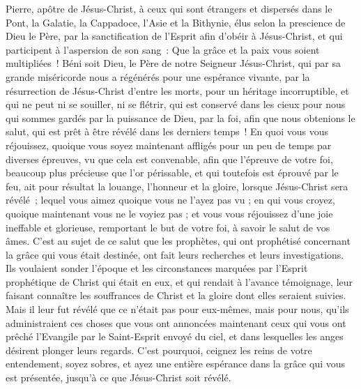 \begin{multicols}{2}
\VerseOne{}Pierre, apôtre de Jésus-Christ, à ceux qui sont étrangers et dispersés dans le Pont, la Galatie, la Cappadoce, l'Asie et la Bithynie,
élus selon la prescience de Dieu le Père, par la sanctification de l'Esprit afin d'obéir à Jésus-Christ, et qui participent à l'aspersion de son sang~: Que la grâce et la paix vous soient multipliées~!
Béni soit Dieu, le Père de notre Seigneur Jésus-Christ, qui par sa grande miséricorde nous a régénérés pour une espérance vivante, par la résurrection de Jésus-Christ d'entre les morts,
pour un héritage incorruptible, et qui ne peut ni se souiller, ni se flétrir, qui est conservé dans les cieux pour nous
qui sommes gardés par la puissance de Dieu, par la foi, afin que nous obtenions le salut, qui est prêt à être révélé dans les derniers temps~!
En quoi vous vous réjouissez, quoique vous soyez maintenant affligés pour un peu de temps par diverses épreuves, vu que cela est convenable,
afin que l'épreuve de votre foi, beaucoup plus précieuse que l'or périssable, et qui toutefois est éprouvé par le feu, ait pour résultat la louange, l'honneur et la gloire, lorsque Jésus-Christ sera révélé~;
lequel vous aimez quoique vous ne l'ayez pas vu ; en qui vous croyez, quoique maintenant vous ne le voyiez pas ; et vous vous réjouissez d'une joie ineffable et glorieuse,
remportant le but de votre foi, à savoir le salut de vos âmes.
C'est au sujet de ce salut que les prophètes, qui ont prophétisé concernant la grâce qui vous était destinée, ont fait leurs recherches et leurs investigations.
Ils voulaient sonder l'époque et les circonstances marquées par l'Esprit prophétique de Christ qui était en eux, et qui rendait à l'avance témoignage, leur faisant connaître les souffrances de Christ et la gloire dont elles seraient suivies.
Mais il leur fut révélé que ce n'était pas pour eux-mêmes, mais pour nous, qu'ils administraient ces choses que vous ont annoncées maintenant ceux qui vous ont prêché l'Evangile par le Saint-Esprit envoyé du ciel, et dans lesquelles les anges désirent plonger leurs regards.
C'est pourquoi, ceignez les reins de votre entendement, soyez sobres, et ayez une entière espérance dans la grâce qui vous est présentée, jusqu'à ce que Jésus-Christ soit révélé.

\end{multicols}
